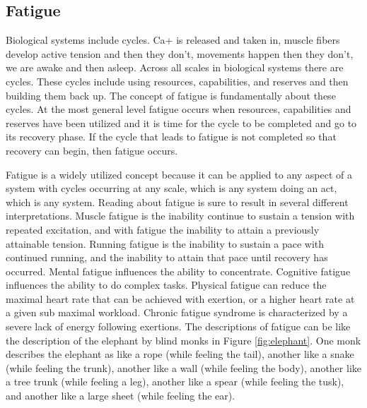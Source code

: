 \subsection{Fatigue}


Biological systems include cycles. Ca+ is released and taken in, muscle fibers develop active tension and then they don't, movements happen then they don't, we are awake and then asleep. Across all scales in biological systems there are cycles. These cycles include using resources, capabilities, and reserves and then building them back up. The concept of fatigue is fundamentally about these cycles. At the most general level fatigue occurs when resources, capabilities and reserves have been utilized and it is time for the cycle to be completed and go to its recovery phase. If the cycle that leads to fatigue is not completed so that recovery can begin, then fatigue occurs.

Fatigue is a widely utilized concept because it can be applied to any aspect of a system with cycles occurring at any scale, which is any system doing an act, which is any system. Reading about fatigue is sure to result in several different interpretations. Muscle fatigue is the inability continue to sustain a tension with repeated excitation, and with fatigue the inability to attain a previously attainable tension. Running fatigue is the inability to sustain a pace with continued running, and the inability to attain that pace until recovery has occurred. Mental fatigue influences the ability to concentrate. Cognitive fatigue influences the ability to do complex tasks. Physical fatigue can reduce the maximal heart rate that can be achieved with exertion, or a higher heart rate at a given sub maximal workload. Chronic fatigue syndrome is characterized by a severe lack of energy following exertions. The descriptions of fatigue can be like the description of the elephant by blind monks in Figure \ref{fig:elephant}. One monk describes the elephant as like a rope (while feeling the tail), another like a snake (while feeling the trunk), another like a wall (while feeling the body), another like a tree trunk (while feeling a leg), another like a spear (while feeling the tusk), and another like a large sheet (while feeling the ear).    

